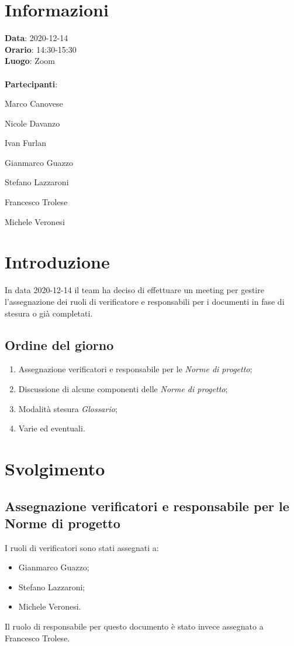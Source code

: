 \section{Informazioni}
\textbf{Data}: 2020-12-14\\
\textbf{Orario}: 14:30-15:30\\
\textbf{Luogo}: Zoom\\\\
\textbf{Partecipanti}:\begin{list}{*}{\setlength{\itemsep}{0cm}}
	\item Marco Canovese
	\item Nicole Davanzo
	\item Ivan Furlan
	\item Gianmarco Guazzo
	\item Stefano Lazzaroni
	\item Francesco Trolese
	\item Michele Veronesi
\end{list}

\section{Introduzione}
In data 2020-12-14 il team ha deciso di effettuare un meeting per gestire l'assegnazione dei ruoli di verificatore e responsabili per i documenti in fase di stesura o già completati.

\subsection{Ordine del giorno}
\begin{enumerate}
    \item Assegnazione verificatori e responsabile per le \textit{Norme di progetto};
    \item Discussione di alcune componenti delle \textit{Norme di progetto};
    \item Modalità stesura \textit{Glossario};
    \item Varie ed eventuali.
\end{enumerate}

\section{Svolgimento}
	\subsection{Assegnazione verificatori e responsabile per le Norme di progetto}
	I ruoli di verificatori sono stati assegnati a:
	\begin{itemize}
		\item Gianmarco Guazzo;
		\item Stefano Lazzaroni;
		\item Michele Veronesi.
	\end{itemize}
	Il ruolo di responsabile per questo documento è stato invece assegnato a Francesco Trolese.


